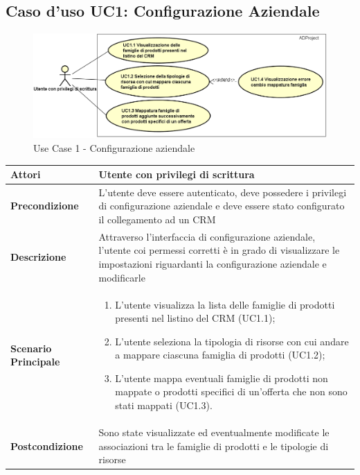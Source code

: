 
	\hypertarget{UC1}{}
	\subsection{Caso d'uso UC1: Configurazione Aziendale}
	
	\begin{figure}[H]
		\centering
		\includegraphics[scale=0.55]{images/useCase/UC1}
		\caption{Use Case 1 - Configurazione aziendale}
		\label{fig:uc1}
	\end{figure}
	\begin{longtable}{ | p{2.7cm} | p{12cm} |}
		\hline \textbf{Attori} & Utente con privilegi di scrittura\\ 
		\hline \textbf{Precondizione} & L’utente deve essere autenticato, deve possedere i privilegi di configurazione aziendale e deve essere stato configurato il collegamento ad un CRM\\
		\hline \textbf{Descrizione} & Attraverso l’interfaccia di configurazione aziendale, l’utente coi permessi corretti è in grado di visualizzare le impostazioni riguardanti la configurazione aziendale e modificarle\\ 
		\hline \textbf{Scenario Principale} & \begin{enumerate}
			\itemsep-0.5em 
			\item L’utente visualizza la lista delle famiglie di prodotti presenti nel listino del CRM  (UC1.1);
			\item L’utente seleziona la tipologia di risorse con cui andare a mappare ciascuna famiglia di prodotti  (UC1.2);
			\item L’utente mappa eventuali famiglie di prodotti non mappate o prodotti specifici di un’offerta che non sono stati mappati  (UC1.3).
			
		\end{enumerate}
		\\ 
		\hline \textbf{Postcondizione} & Sono state visualizzate ed eventualmente modificate le associazioni tra le famiglie di prodotti e le tipologie di risorse\\ 
		\hline 
	\end{longtable}
	
